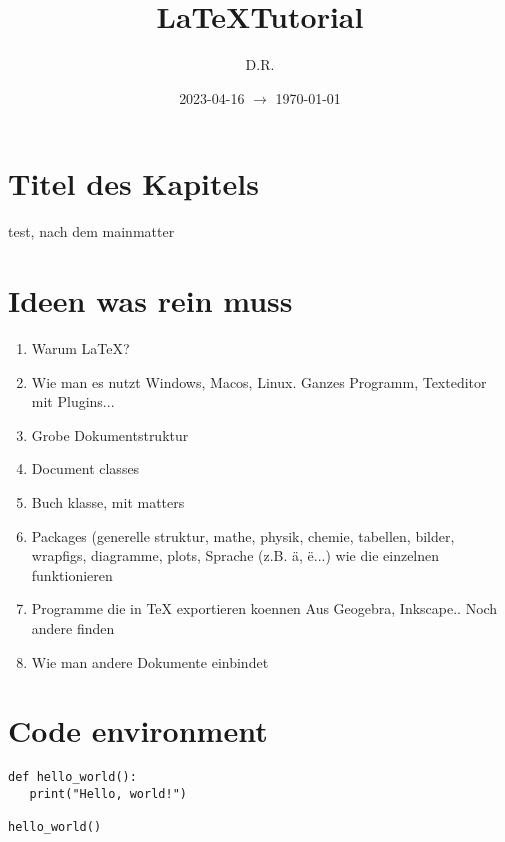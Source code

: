 \documentclass{book}
\title{\LaTeX Tutorial}
\author{D.R.}
\date{2023-04-16 $\to$ \today}
\begin{document}
\maketitle

\tableofcontents

\frontmatter

\mainmatter

\chapter{Titel des Kapitels}
test, nach dem mainmatter




\chapter{Ideen was rein muss}
\begin{enumerate}
  \item Warum \LaTeX?
  \item Wie man es nutzt
    \subitem Windows, Macos, Linux.
    \subitem Ganzes Programm, Texteditor mit Plugins...
  \item Grobe Dokumentstruktur
  \item Document classes
  \item Buch klasse, mit matters
  \item Packages (generelle struktur, mathe, physik, chemie, tabellen, bilder,
    wrapfigs, diagramme, plots, Sprache (z.B. \"a, \"e...)
    \subitem wie die einzelnen funktionieren
  \item Programme die in TeX exportieren koennen
    \subitem Aus Geogebra, Inkscape.. Noch andere finden
  \item Wie man andere Dokumente einbindet
\end{enumerate}

\chapter{Code environment}
\begin{verbatim}
def hello_world():
   print("Hello, world!")
   
hello_world()
\end{verbatim}

\hrulefill
\end{document}
